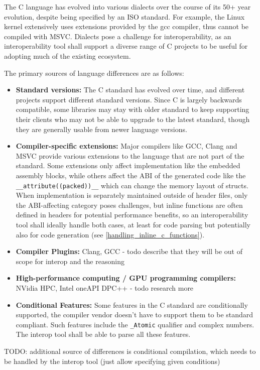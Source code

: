 The C language has evolved into various dialects over the course of its 50+ year evolution, despite being specified by an ISO standard. For example, the Linux kernel extensively uses extensions provided by the gcc compiler, thus cannot be compiled with MSVC. Dialects pose a challenge for interoperability, as an interoperability tool shall support a diverse range of C projects to be useful for adopting much of the existing ecosystem.

The primary sources of language differences are as follows:
\begin{itemize}
    \item \textbf{Standard versions:} The C standard has evolved over time, and different projects support different standard versions. Since C is largely backwards compatible, some libraries may stay with older standard to keep supporting their clients who may not be able to upgrade to the latest standard, though they are generally usable from newer language versions.
    \item \textbf{Compiler-specific extensions:} Major compilers like GCC, Clang and MSVC provide various extensions to the language that are not part of the standard. Some extensions only affect implementation like the embedded assembly blocks, while others affect the ABI of the generated code like the \verb|__attribute((packed))__| which can change the memory layout of structs. When implementation is separately maintained outside of header files, only the ABI-affecting category poses challenges, but inline functions are often defined in headers for potential performance benefits, so an interoperability tool shall ideally handle both cases, at least for code parsing but potentially also for code generation (see \autoref{handling_inline_c_functions}).
    \item \textbf{Compiler Plugins:} Clang, GCC - todo describe that they will be out of scope for interop and the reasoning
    \item \textbf{High-performance computing / GPU programming compilers:} NVidia HPC, Intel oneAPI DPC++ - todo research more
    \item \textbf{Conditional Features:} Some features in the C standard are conditionally supported, the compiler vendor doesn't have to support them to be standard compliant. Such features include the \verb|_Atomic| qualifier and complex numbers. The interop tool shall be able to parse all these features.
\end{itemize}
 
TODO: additional source of differences is conditional compilation, which needs to be handled by the interop tool (just allow specifying given conditions)

